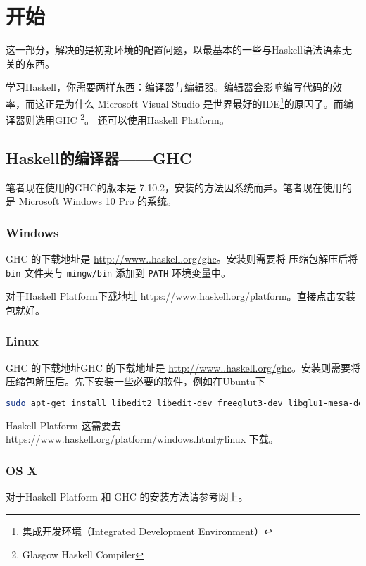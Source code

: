 
\chapter{开始}
这一部分，解决的是初期环境的配置问题，以最基本的一些与Haskell语法语素无关的东西。

学习Haskell，你需要两样东西：编译器与编辑器。编辑器会影响编写代码的效率，而这正是为什么 Microsoft Visual Studio 是世界最好的IDE\footnote{集成开发环境（Integrated Development Environment）}的原因了。而编译器则选用GHC \footnote{Glasgow Haskell Compiler}。
还可以使用Haskell Platform。
\section{Haskell的编译器——GHC}
笔者现在使用的GHC的版本是 7.10.2，安装的方法因系统而异。笔者现在使用的是 Microsoft Windows 10 Pro 的系统。
\subsection{Windows}
GHC 的下载地址是 \url{http://www..haskell.org/ghc}。安装则需要将 压缩包解压后将 \verb"bin" 文件夹与 \verb"mingw/bin" 添加到 \verb"PATH" 环境变量中。

对于Haskell Platform下载地址 \url{https://www.haskell.org/platform}。直接点击安装包就好。
\subsection{Linux}
GHC 的下载地址GHC 的下载地址是 \url{http://www..haskell.org/ghc}。安装则需要将压缩包解压后。先下安装一些必要的软件，例如在Ubuntu下
\begin{lstlisting}[language=bash]
	sudo apt-get install libedit2 libedit-dev freeglut3-dev libglu1-mesa-dev libgmp3-dev
\end{lstlisting}

Haskell Platform 这需要去 \url{https://www.haskell.org/platform/windows.html#linux} 下载。
\subsection{OS X}
对于Haskell Platform 和 GHC 的安装方法请参考网上。


